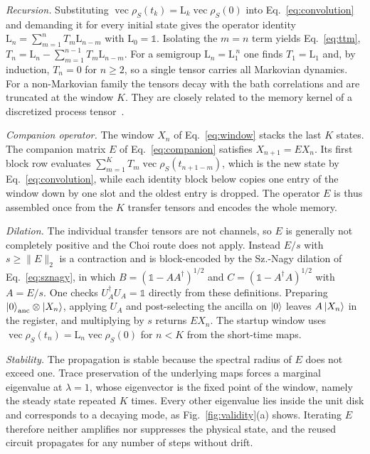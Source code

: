\documentclass[aps,pra,twocolumn,superscriptaddress,nofootinbib,longbibliography]{revtex4-2}
\DeclareMathOperator{\vecc}{vec}
\newcommand{\id}{\mathds{1}}
\newcommand{\rhoS}{\rho_{S}}
\newcommand{\Lmap}{\mathrm{L}}
\begin{document}
\emph{Recursion.} Substituting $\vecc\rhoS(t_k)=\Lmap_k\vecc\rhoS(0)$ into
Eq.~\eqref{eq:convolution} and demanding it for every initial state gives the
operator identity $\Lmap_n=\sum_{m=1}^{n}T_m\Lmap_{n-m}$ with $\Lmap_0=\id$.
Isolating the $m=n$ term yields Eq.~\eqref{eq:ttm},
$T_n=\Lmap_n-\sum_{m=1}^{n-1}T_m\Lmap_{n-m}$. For a semigroup
$\Lmap_n=\Lmap_1^{\,n}$ one finds $T_1=\Lmap_1$ and, by induction, $T_n=0$ for
$n\ge2$, so a single tensor carries all Markovian dynamics. For a non-Markovian
family the tensors decay with the bath correlations and are truncated at the
window $K$. They are closely related to the memory kernel of a discretized
process tensor~\cite{pollock2018,jorgensen2019}.

\emph{Companion operator.} The window $X_n$ of Eq.~\eqref{eq:window} stacks the
last $K$ states. The companion matrix $E$ of Eq.~\eqref{eq:companion} satisfies
$X_{n+1}=EX_n$. Its first block row evaluates
$\sum_{m=1}^{K}T_m\vecc\rhoS(t_{n+1-m})$, which is the new state by
Eq.~\eqref{eq:convolution}, while each identity block below copies one entry of
the window down by one slot and the oldest entry is dropped. The operator $E$ is
thus assembled once from the $K$ transfer tensors and encodes the whole memory.

\emph{Dilation.} The individual transfer tensors are not channels, so $E$ is
generally not completely positive and the Choi route does not apply. Instead
$E/s$ with $s\ge\|E\|_2$ is a contraction and is block-encoded by the Sz.-Nagy
dilation of Eq.~\eqref{eq:sznagy}, in which $B=(\id-AA^\dagger)^{1/2}$ and
$C=(\id-A^\dagger A)^{1/2}$ with $A=E/s$. One checks $U_A^\dagger U_A=\id$ directly
from these definitions. Preparing $\ket{0}_{\rm anc}\otimes\ket{X_n}$, applying
$U_A$ and post-selecting the ancilla on $\ket{0}$ leaves $A\ket{X_n}$ in the
register, and multiplying by $s$ returns $EX_n$. The startup window uses
$\vecc\rhoS(t_n)=\Lmap_n\vecc\rhoS(0)$ for $n<K$ from the short-time maps.

\emph{Stability.} The propagation is stable because the spectral radius of $E$
does not exceed one. Trace preservation of the underlying maps forces a marginal
eigenvalue at $\lambda=1$, whose eigenvector is the fixed point of the window,
namely the steady state repeated $K$ times. Every other eigenvalue lies inside
the unit disk and corresponds to a decaying mode, as Fig.~\ref{fig:validity}(a)
shows. Iterating $E$ therefore neither amplifies nor suppresses the physical
state, and the reused circuit propagates for any number of steps without drift.
\end{document}
